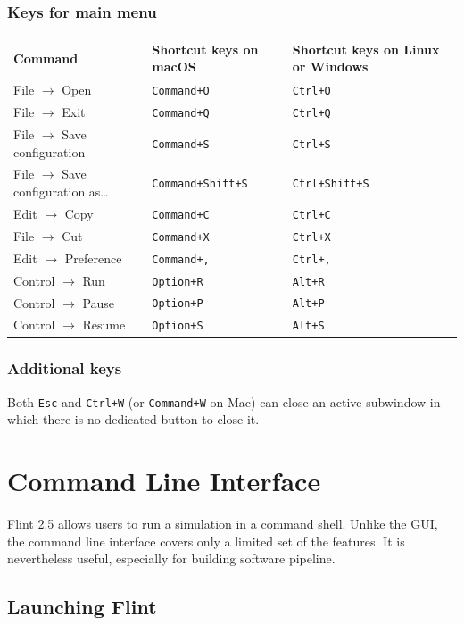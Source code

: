 \documentclass[a4paper,10pt]{report}
\begin{document}
\subsection{Keys for main menu}
\label{sec:orgfe3076e}
\begin{center}
\begin{tabular}{l||l|l}
Command & Shortcut keys on macOS & Shortcut keys on Linux or Windows\\
\hline
File \(\to\) Open & \texttt{Command+O} & \texttt{Ctrl+O}\\
File \(\to\) Exit & \texttt{Command+Q} & \texttt{Ctrl+Q}\\
File \(\to\) Save configuration & \texttt{Command+S} & \texttt{Ctrl+S}\\
File \(\to\) Save configuration as\ldots{} & \texttt{Command+Shift+S} & \texttt{Ctrl+Shift+S}\\
Edit \(\to\) Copy & \texttt{Command+C} & \texttt{Ctrl+C}\\
File \(\to\) Cut & \texttt{Command+X} & \texttt{Ctrl+X}\\
Edit \(\to\) Preference & \texttt{Command+,} & \texttt{Ctrl+,}\\
Control \(\to\) Run & \texttt{Option+R} & \texttt{Alt+R}\\
Control \(\to\) Pause & \texttt{Option+P} & \texttt{Alt+P}\\
Control \(\to\) Resume & \texttt{Option+S} & \texttt{Alt+S}\\
\end{tabular}
\end{center}

\subsection{Additional keys}
\label{sec:orgfd52e60}
Both \texttt{Esc} and \texttt{Ctrl+W} (or \texttt{Command+W} on Mac) can close an active
subwindow in which there is no dedicated button to close it.

\chapter{Command Line Interface}
\label{sec:org6eb2c39}
Flint 2.5 allows users to run a simulation in a command shell.
Unlike the GUI, the command line interface covers only a limited set of
the features. It is nevertheless useful, especially for building software pipeline.

\section{Launching Flint}
\label{sec:org7fb14fe}
\end{document}
